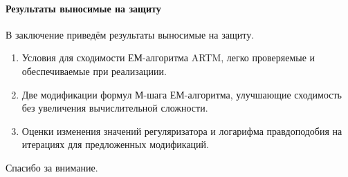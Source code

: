 \documentclass[12pt]{article}
\begin{document}
\paragraph{Результаты выносимые на защиту}
В заключение приведём результаты выносимые на защиту.
\begin{enumerate}
\item Условия для сходимости ЕМ-алгоритма ARTM, легко проверяемые и обеспечиваемые при реализациии.
\item Две модификации формул М-шага ЕМ-алгоритма, улучшающие сходимость без увеличения вычислительной сложности.
\item Оценки изменения значений регуляризатора и логарифма правдоподобия на итерациях для предложенных модификаций.
\end{enumerate}
Спасибо за внимание.
\end{document}
